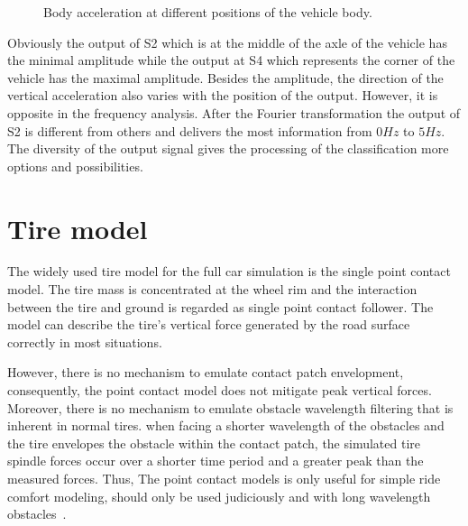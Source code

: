 \begin{figure}
 \label{fig:position_of_output}
 \caption{Body acceleration at different positions of the vehicle body.}
 \end{figure}
 
 Obviously the output of S2 which is at the middle of the axle of the vehicle has the minimal amplitude while the output at S4 which represents the corner of the vehicle has the maximal amplitude. 
 Besides the amplitude, the direction of the vertical acceleration also varies with the position of the output. 
 However, it is opposite in the frequency analysis.
 After the Fourier transformation the output of S2 is different from others and delivers the most information from $0Hz$ to $5Hz$.
 The diversity of the output signal gives the processing of the classification more options and possibilities.
 



 \section{Tire model}
 \label{sec:tire_model}
 
The widely used tire model for the full car simulation is the single point contact model. 
%
The tire mass is concentrated at the wheel rim and the interaction between the tire and ground is regarded as single point contact follower. 
%
The model can describe the tire’s vertical force generated by the road surface correctly in most situations.

However, there is no mechanism to emulate contact patch envelopment, consequently, the point contact model does not mitigate peak vertical forces.
%
Moreover, there is no mechanism to emulate obstacle wavelength filtering that is inherent in normal tires.
%
when facing a shorter wavelength of the obstacles and the tire envelopes the obstacle within the contact patch, the simulated tire spindle forces occur over a shorter time period and a greater peak than the measured forces.
%
Thus, The point contact models is only useful for simple ride comfort modeling, should only be used judiciously and with long wavelength obstacles~\cite{frey2012development}.
 
